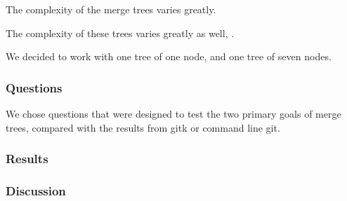 The complexity of the merge trees varies greatly.

The complexity of these trees varies greatly as well, . %



We decided to work with one tree of one node, and one tree of seven
nodes.

\subsubsection{Questions}
\label{ssub:questions}

We chose questions that were designed to test the two primary goals of
merge trees, compared with the results from gitk or command line git. 

\subsubsection{Results}
\label{ssub:results}

\subsubsection{Discussion}
\label{ssub:discussion}

